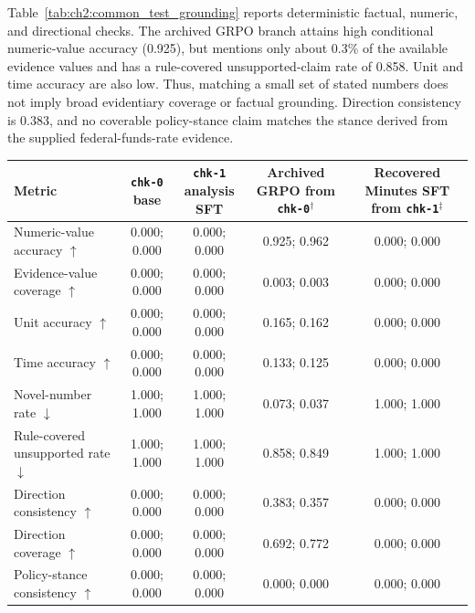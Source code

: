 Table~\ref{tab:ch2:common_test_grounding} reports deterministic factual,
numeric, and directional checks.  The archived GRPO branch attains high
conditional numeric-value accuracy (0.925), but mentions only about 0.3\% of
the available evidence values and has a rule-covered unsupported-claim rate
of 0.858.  Unit and time accuracy are also low.  Thus, matching a small set
of stated numbers does not imply broad evidentiary coverage or factual
grounding.  Direction consistency is 0.383, and no coverable policy-stance
claim matches the stance derived from the supplied federal-funds-rate
evidence.

\begin{table}[htbp]
    \centering
    \scriptsize
    \begin{tabular}{p{} c c c c}
        \toprule
        \textbf{Metric} &
        \makecell[c]{\texttt{chk-0}\\base} &
        \makecell[c]{\texttt{chk-1}\\analysis SFT} &
        \makecell[c]{Archived GRPO\\from \texttt{chk-0}$^{\dagger}$} &
        \makecell[c]{Recovered Minutes SFT\\from \texttt{chk-1}$^{\ddagger}$} \\
        \midrule
        Numeric-value accuracy $\uparrow$ & 0.000; 0.000 & 0.000; 0.000 & 0.925; 0.962 & 0.000; 0.000 \\
        Evidence-value coverage $\uparrow$ & 0.000; 0.000 & 0.000; 0.000 & 0.003; 0.003 & 0.000; 0.000 \\
        Unit accuracy $\uparrow$ & 0.000; 0.000 & 0.000; 0.000 & 0.165; 0.162 & 0.000; 0.000 \\
        Time accuracy $\uparrow$ & 0.000; 0.000 & 0.000; 0.000 & 0.133; 0.125 & 0.000; 0.000 \\
        Novel-number rate $\downarrow$ & 1.000; 1.000 & 1.000; 1.000 & 0.073; 0.037 & 1.000; 1.000 \\
        Rule-covered unsupported rate $\downarrow$ & 1.000; 1.000 & 1.000; 1.000 & 0.858; 0.849 & 1.000; 1.000 \\
        Direction consistency $\uparrow$ & 0.000; 0.000 & 0.000; 0.000 & 0.383; 0.357 & 0.000; 0.000 \\
        Direction coverage $\uparrow$ & 0.000; 0.000 & 0.000; 0.000 & 0.692; 0.772 & 0.000; 0.000 \\
        Policy-stance consistency $\uparrow$ & 0.000; 0.000 & 0.000; 0.000 & 0.000; 0.000 & 0.000; 0.000 \\

\end{tabular}
\end{table}
